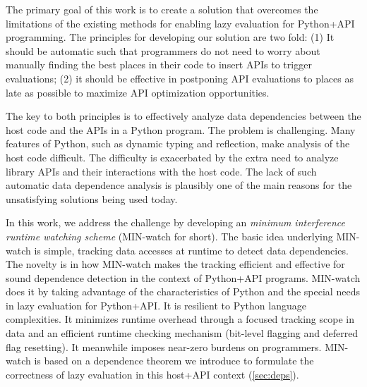 \documentclass[sigconf]{acmart}\settopmatter{printfolios=true,printccs=false,printacmref=false}\setcopyright{none}
\begin{document}

The primary goal of this work is to create a solution that overcomes the limitations of the existing methods for enabling lazy evaluation for Python+API programming. The principles for developing our solution are two fold: (1) It should be automatic such that programmers do not need to worry about manually finding the best places in their code to insert APIs to trigger evaluations; (2) it should be effective in postponing API evaluations to places as late as possible to maximize API optimization opportunities. 

The key to both principles is to effectively analyze data dependencies between the host code and the APIs in a Python program. The problem is challenging. Many features of Python, such as dynamic typing and reflection, make analysis of the host code difficult. The difficulty is exacerbated by the extra need to analyze library APIs and their interactions with the host code. The lack of such automatic data dependence analysis is plausibly one of the main reasons for the unsatisfying solutions being used today.

In this work, we address the challenge by developing an {\em minimum interference runtime watching scheme} (MIN-watch for short). The basic idea underlying MIN-watch is simple, tracking data accesses at runtime to detect data dependencies. The novelty is in how MIN-watch makes the tracking efficient and effective for sound dependence detection in the context of Python+API programs. MIN-watch does it by taking advantage of the characteristics of Python and the special needs in lazy evaluation for Python+API. It is resilient to Python language complexities. It minimizes runtime overhead through a focused tracking scope in data and an efficient runtime checking mechanism (bit-level flagging and deferred flag resetting). It meanwhile imposes near-zero burdens on programmers. MIN-watch is based on a dependence theorem we introduce to formulate the correctness of lazy evaluation in this host+API context (\cref{sec:deps}). 
\end{document}
